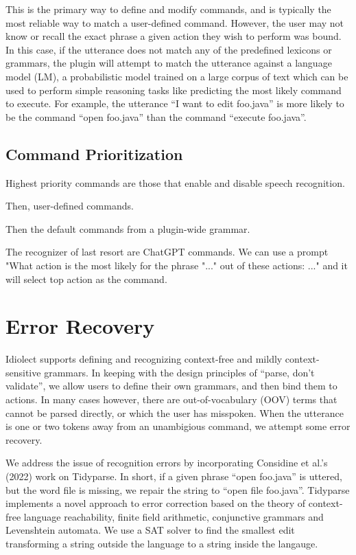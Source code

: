 \documentclass[conference]{IEEEtran}
\begin{document}
This is the primary way to define and modify commands, and is typically the most reliable way to match a user-defined command. However, the user may not know or recall the exact phrase a given action they wish to perform was bound. In this case, if the utterance does not match any of the predefined lexicons or grammars, the plugin will attempt to match the utterance against a language model (LM), a probabilistic model trained on a large corpus of text which can be used to perform simple reasoning tasks like predicting the most likely command to execute. For example, the utterance ``I want to edit foo.java'' is more likely to be the command ``open foo.java'' than the command ``execute foo.java''.

\subsection{Command Prioritization}

Highest priority commands are those that enable and disable speech recognition.

Then, user-defined commands.

Then the default commands from a plugin-wide grammar.

The recognizer of last resort are ChatGPT commands. We can use a prompt "What action is the most likely for the phrase "..." out of these actions: ..." and it will select top action as the command.

\section{Error Recovery}

Idiolect supports defining and recognizing context-free and mildly context-sensitive grammars. In keeping with the design principles of ``parse, don't validate'', we allow users to define their own grammars, and then bind them to actions. In many cases however, there are out-of-vocabulary (OOV) terms that cannot be parsed directly, or which the user has misspoken. When the utterance is one or two tokens away from an unambigious command, we attempt some error recovery.

We address the issue of recognition errors by incorporating Considine et al.'s (2022) work on Tidyparse. In short, if a given phrase ``open foo.java'' is uttered, but the word file is missing, we repair the string to ``open file foo.java''. Tidyparse implements a novel approach to error correction based on the theory of context-free language reachability, finite field arithmetic, conjunctive grammars and Levenshtein automata. We use a SAT solver to find the smallest edit transforming a string outside the language to a string inside the langauge.
\end{document}
